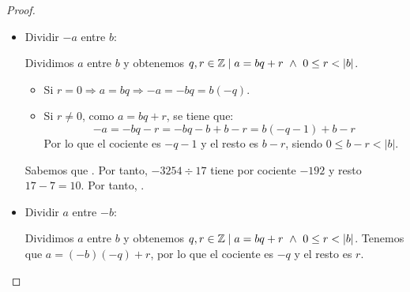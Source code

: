 \begin{proof}
\begin{itemize}
        Sea $X = \{a-bq \mid q \in \N \}\cap \N$. Tenemos que $X\neq \emptyset$ por ser $a-b\in X$. Como $\emptyset \neq X \subseteq \N$, con $\N$ bien ordenado\footnote{Este teorema es materia de la asignatura de Cálculo I.}, $X$ tiene mínimo. Sea $r=\min X$. Como $r \in X \Longrightarrow r\geq 0 \y \exists q \in \N \mid r = a-bq \Longrightarrow a=bq+r$. Falta que $r<b$: \\
    
        Por reducción al absurdo, supongamos que $r \geq b$ y consideramos $r'=~r-~b\geq~0$.
        \begin{equation*}
            r'=r-b=a-bq-b = a-b(q+1) \mathop{\Longrightarrow}^{r'\geq 0} r' \in X \y r' < r
        \end{equation*}
        \underline{Contradicción} con que $r$ era el mínimo de $X$. Por tanto, se tiene que~$r<b$.

        \begin{ejemplo} Consideramos $a=3254,~b=17$. Tenemos que la división es:
            $$\opidiv{3254}{17}$$
            Por tanto, . Es decir, $q=191,~r=7$.
        \end{ejemplo}

        \item Dividir $-a$ entre $b$:
        
        Dividimos $a$ entre $b$ y obtenemos $q, r \in \mathbb Z \mid a=bq+r \ \land \  0\leq r < |b|$.
        \begin{itemize}
            \item Si $r=0 \Longrightarrow a=bq \Longrightarrow -a = -bq = b(-q)$.
            \item Si $r\neq 0$, como $a=bq+r$, se tiene que: $$ -a = -bq-r = -bq -b + b - r = b(-q-1)+b-r$$            
            Por lo que el cociente es $-q-1$ y el resto es $b-r$, siendo $0 \leq b-r < |b|$.
        \end{itemize}

        \begin{ejemplo}
            Sabemos que . Por tanto, $-3254\div 17$ tiene por cociente $-192$ y resto $17-7=10$. Por tanto, .
        \end{ejemplo}

        \item Dividir $a$ entre $-b$:
        
        Dividimos $a$ entre $b$ y obtenemos $q, r \in \mathbb Z \mid a=bq+r \ \land \  0\leq r < |b|$.
        Tenemos que $a = (-b)(-q)+r$, por lo que el cociente es $-q$ y el resto es $r$.


\end{itemize}
\end{proof}

